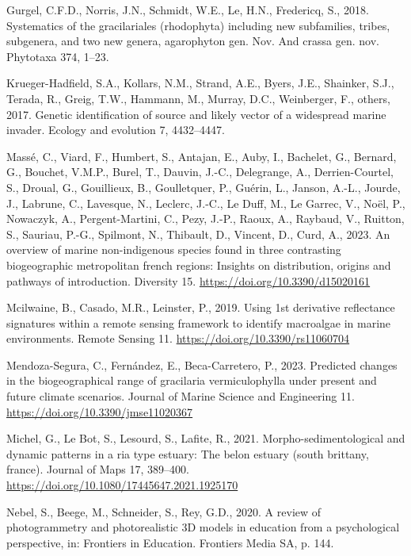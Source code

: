 \documentclass[
  letterpaper,
  DIV=11,
  numbers=noendperiod]{scrartcl}
\newlength{\cslhangindent}
\newenvironment{CSLReferences}[2] %
 {\begin{list}{}{%
  \setlength{\itemindent}{0pt}
  \setlength{\leftmargin}{0pt}
  \setlength{\parsep}{0pt}
  \ifodd #1
   \setlength{\leftmargin}{\cslhangindent}
   \setlength{\itemindent}{-1\cslhangindent}
  \fi
  \setlength{\itemsep}{#2\baselineskip}}}
 {\end{list}}
\begin{document}
\begin{CSLReferences}{1}{0}
Gurgel, C.F.D., Norris, J.N., Schmidt, W.E., Le, H.N., Fredericq, S.,
2018. Systematics of the gracilariales (rhodophyta) including new
subfamilies, tribes, subgenera, and two new genera, agarophyton gen.
Nov. And crassa gen. nov. Phytotaxa 374, 1--23.

Krueger-Hadfield, S.A., Kollars, N.M., Strand, A.E., Byers, J.E.,
Shainker, S.J., Terada, R., Greig, T.W., Hammann, M., Murray, D.C.,
Weinberger, F., others, 2017. Genetic identification of source and
likely vector of a widespread marine invader. Ecology and evolution 7,
4432--4447.

Massé, C., Viard, F., Humbert, S., Antajan, E., Auby, I., Bachelet, G.,
Bernard, G., Bouchet, V.M.P., Burel, T., Dauvin, J.-C., Delegrange, A.,
Derrien-Courtel, S., Droual, G., Gouillieux, B., Goulletquer, P.,
Guérin, L., Janson, A.-L., Jourde, J., Labrune, C., Lavesque, N.,
Leclerc, J.-C., Le Duff, M., Le Garrec, V., Noël, P., Nowaczyk, A.,
Pergent-Martini, C., Pezy, J.-P., Raoux, A., Raybaud, V., Ruitton, S.,
Sauriau, P.-G., Spilmont, N., Thibault, D., Vincent, D., Curd, A., 2023.
An overview of marine non-indigenous species found in three contrasting
biogeographic metropolitan french regions: Insights on distribution,
origins and pathways of introduction. Diversity 15.
\url{https://doi.org/10.3390/d15020161}

Mcilwaine, B., Casado, M.R., Leinster, P., 2019. Using 1st derivative
reflectance signatures within a remote sensing framework to identify
macroalgae in marine environments. Remote Sensing 11.
\url{https://doi.org/10.3390/rs11060704}

Mendoza-Segura, C., Fernández, E., Beca-Carretero, P., 2023. Predicted
changes in the biogeographical range of gracilaria vermiculophylla under
present and future climate scenarios. Journal of Marine Science and
Engineering 11. \url{https://doi.org/10.3390/jmse11020367}

Michel, G., Le Bot, S., Lesourd, S., Lafite, R., 2021.
Morpho-sedimentological and dynamic patterns in a ria type estuary: The
belon estuary (south brittany, france). Journal of Maps 17, 389--400.
\url{https://doi.org/10.1080/17445647.2021.1925170}

Nebel, S., Beege, M., Schneider, S., Rey, G.D., 2020. A review of
photogrammetry and photorealistic 3D models in education from a
psychological perspective, in: Frontiers in Education. Frontiers Media
SA, p. 144.


\end{CSLReferences}
\end{document}
